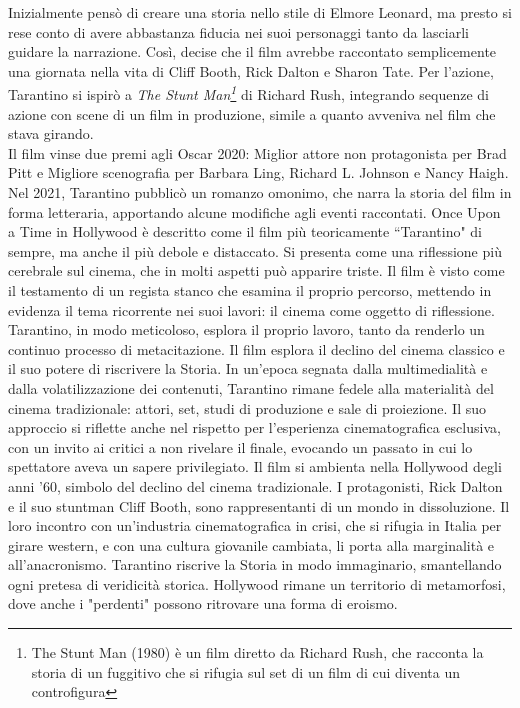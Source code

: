 \documentclass[12pt]{article} %
\begin{document}
\begin{flushleft}
    Inizialmente pensò di creare una storia nello stile di Elmore Leonard, ma presto si rese conto di avere abbastanza fiducia nei suoi personaggi tanto da lasciarli guidare la narrazione. 
    Così, decise che il film avrebbe raccontato semplicemente una giornata nella vita di Cliff Booth, Rick Dalton e Sharon Tate. 
    Per l'azione, Tarantino si ispirò a \textit{The Stunt Man\footnote{The Stunt Man (1980) è un film diretto da Richard Rush, che racconta la storia di un fuggitivo che si rifugia sul set di un film di cui diventa un controfigura}} di Richard Rush, integrando sequenze di azione con scene di un film in produzione, simile a quanto avveniva nel film che stava girando.
    \\\vspace{1cm}
    Il film vinse due premi agli Oscar 2020: Miglior attore non protagonista per Brad Pitt e Migliore scenografia per Barbara Ling, Richard L. Johnson e Nancy Haigh. Nel 2021, Tarantino pubblicò un romanzo omonimo, che narra la storia del film in forma letteraria, apportando alcune modifiche agli eventi raccontati.
    Once Upon a Time in Hollywood è descritto come il film più teoricamente ``Tarantino" di sempre, ma anche il più debole e distaccato. Si presenta come una riflessione più cerebrale sul cinema, che in molti aspetti può apparire triste. Il film è visto come il testamento di un regista stanco che esamina il proprio percorso, mettendo in evidenza il tema ricorrente nei suoi lavori: il cinema come oggetto di riflessione. Tarantino, in modo meticoloso, esplora il proprio lavoro, tanto da renderlo un continuo processo di metacitazione.
    Il film esplora il declino del cinema classico e il suo potere di riscrivere la Storia. In un'epoca segnata dalla multimedialità e dalla volatilizzazione dei contenuti, Tarantino rimane fedele alla materialità del cinema tradizionale: attori, set, studi di produzione e sale di proiezione. Il suo approccio si riflette anche nel rispetto per l’esperienza cinematografica esclusiva, con un invito ai critici a non rivelare il finale, evocando un passato in cui lo spettatore aveva un sapere privilegiato. 
    Il film si ambienta nella Hollywood degli anni '60, simbolo del declino del cinema tradizionale. I protagonisti, Rick Dalton e il suo stuntman Cliff Booth, sono rappresentanti di un mondo in dissoluzione. Il loro incontro con un'industria cinematografica in crisi, che si rifugia in Italia per girare western, e con una cultura giovanile cambiata, li porta alla marginalità e all'anacronismo. 
    Tarantino riscrive la Storia in modo immaginario, smantellando ogni pretesa di veridicità storica. Hollywood rimane un territorio di metamorfosi, dove anche i "perdenti" possono ritrovare una forma di eroismo.
\end{flushleft}
\break
\end{document}
